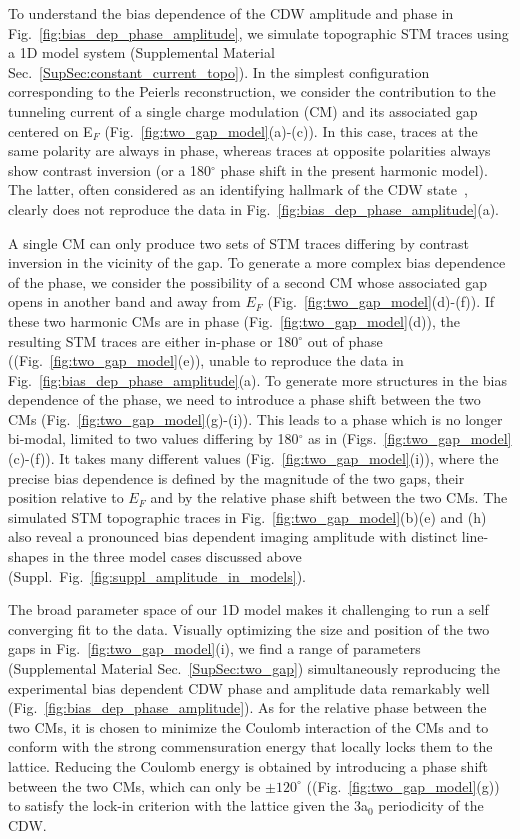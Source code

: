 \documentclass[aps,prl,twocolumn,superscriptaddress]{revtex4-2}
\def \suppsec[#1]{Supplemental Material Sec.~\ref{#1}}
\def \SF[#1]{Suppl.~Fig.~\ref{#1}}
\begin{document}
To understand the bias dependence of the CDW amplitude and phase in Fig.~\ref{fig:bias_dep_phase_amplitude}, we simulate topographic STM traces using a 1D model system  (\suppsec[SupSec:constant_current_topo]). In the simplest configuration corresponding to the Peierls reconstruction, we consider the contribution to the tunneling current of a single charge modulation (CM) and its associated gap centered on E$_F$ (Fig.~\ref{fig:two_gap_model}(a)-(c)). In this case, traces at the same polarity are always in phase, whereas traces at opposite polarities always show contrast inversion (or a 180$^{\circ}$ phase shift in the present harmonic model). The latter, often considered as an identifying hallmark of the CDW state~\cite{Spera2019}, clearly does not reproduce the data in Fig.~\ref{fig:bias_dep_phase_amplitude}(a). 

A single CM can only produce two sets of STM traces differing by contrast inversion in the vicinity of the gap. To generate a more complex bias dependence of the phase, we consider the possibility of a second CM whose associated gap opens in another band and away from $E_F$ (Fig.~\ref{fig:two_gap_model}(d)-(f)). If these two harmonic CMs are in phase (Fig.~\ref{fig:two_gap_model}(d)), the resulting STM traces are either in-phase or 180$^{\circ}$ out of phase ((Fig.~\ref{fig:two_gap_model}(e)), unable to reproduce the data in Fig.~\ref{fig:bias_dep_phase_amplitude}(a). To generate more structures in the bias dependence of the phase, we need to introduce a phase shift between the two CMs (Fig.~\ref{fig:two_gap_model}(g)-(i)). This leads to a phase which is no longer bi-modal, limited to two values differing by 180$^{\circ}$ as in (Figs.~\ref{fig:two_gap_model}(c)-(f)). It takes many different values (Fig.~\ref{fig:two_gap_model}(i)), where the precise bias dependence is defined by the magnitude of the two gaps, their position relative to $E_F$ and by the relative phase shift between the two CMs. The simulated STM topographic traces in Fig.~\ref{fig:two_gap_model}(b)(e) and (h) also reveal a pronounced bias dependent imaging amplitude with distinct line-shapes in the three model cases discussed above (\SF[fig:suppl_amplitude_in_models]). 

The broad parameter space of our 1D model makes it challenging to run a self converging fit to the data. Visually optimizing the size and position of the two gaps in Fig.~\ref{fig:two_gap_model}(i), we find a range of parameters (\suppsec[SupSec:two_gap])  simultaneously reproducing the experimental bias dependent CDW phase and amplitude data remarkably well (Fig.~\ref{fig:bias_dep_phase_amplitude}). As for the relative phase between the two CMs, it is chosen to minimize the Coulomb interaction of the CMs and to conform with the strong commensuration energy that locally locks them to the lattice. Reducing the Coulomb energy is obtained by introducing a phase shift between the two CMs, which can only be $\pm120^\circ$ ((Fig.~\ref{fig:two_gap_model}(g)) to satisfy the lock-in criterion with the lattice given the 3a$_0$ periodicity of the CDW.
\end{document}
